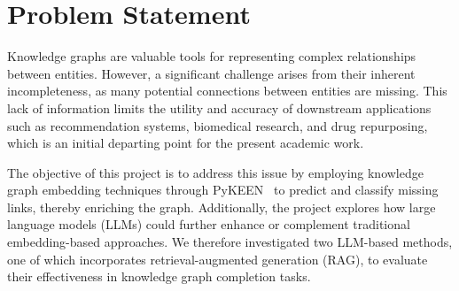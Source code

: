 \section*{Problem Statement}


Knowledge graphs are valuable tools for representing complex relationships between entities.
However, a significant challenge arises from their inherent incompleteness, as many potential connections between entities are missing.
This lack of information limits the utility and accuracy of downstream applications such as recommendation systems, biomedical research, and drug repurposing, which is an initial departing point for the present academic work.

The objective of this project is to address this issue by employing knowledge graph embedding techniques through PyKEEN~\cite{pykeen} to predict and classify missing links, thereby enriching the graph.
Additionally, the project explores how large language models (LLMs) could further enhance or complement traditional embedding-based approaches.
We therefore investigated two LLM-based methods, one of which incorporates retrieval-augmented generation (RAG), to evaluate their effectiveness in knowledge graph completion tasks.